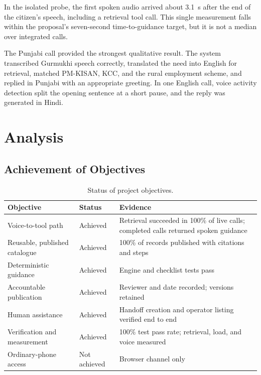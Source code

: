 \documentclass[11pt,a4paper,oneside]{report}
\begin{document}
In the isolated probe, the first spoken audio arrived about 3.1~s after the end of
the citizen's speech, including a retrieval tool call. This single measurement
falls within the proposal's seven-second time-to-guidance target, but it is not a
median over integrated calls.

The Punjabi call provided the strongest qualitative result. The system transcribed
Gurmukhi speech correctly, translated the need into English for retrieval, matched
PM-KISAN, KCC, and the rural employment scheme, and replied in Punjabi with an
appropriate greeting. In one English call, voice activity detection split the
opening sentence at a short pause, and the reply was generated in Hindi.

\section{Analysis}

\subsection{Achievement of Objectives}
\begin{table}[htbp]
\centering\small
\begin{tabularx}{\textwidth}{@{}P{0.32\textwidth}P{0.15\textwidth}Y@{}}
\toprule
\textbf{Objective} & \textbf{Status} & \textbf{Evidence} \\
\midrule
Voice-to-tool path & Achieved & Retrieval succeeded in 100\% of live calls;
  completed calls returned spoken guidance \\
Reusable, published catalogue & Achieved & 100\% of records published with
  citations and steps \\
Deterministic guidance & Achieved & Engine and checklist tests pass \\
Accountable publication & Achieved & Reviewer and date recorded; versions
  retained \\
Human assistance & Achieved & Handoff creation and operator listing verified
  end to end \\
Verification and measurement & Achieved & 100\% test pass rate; retrieval,
  load, and voice measured \\
Ordinary-phone access & Not achieved & Browser channel only \\
\bottomrule
\end{tabularx}
\caption{Status of project objectives.}
\label{tab:objectives}
\end{table}
\end{document}
